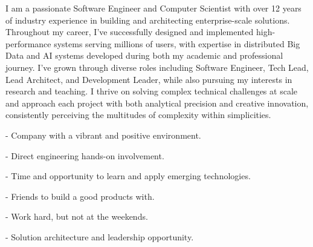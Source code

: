 \documentclass[10pt,a4paper,ragged2e,withhyper]{altacv}
\begin{document}



\begin{raggedright}
  I am a passionate Software Engineer and Computer Scientist with over 12 years of industry experience 
  in building and architecting enterprise-scale solutions. Throughout my career, I've successfully 
  designed and implemented high-performance systems serving millions of users, with expertise in 
  distributed Big Data and AI systems developed during both my academic and professional journey. 
  \newline I've grown through diverse roles including Software Engineer, Tech Lead, Lead Architect, 
  and Development Leader, while also pursuing my interests in research and teaching. I thrive on 
  solving complex technical challenges at scale and approach each project with both analytical 
  precision and creative innovation, consistently perceiving the multitudes of complexity within 
  simplicities.
\end{raggedright}

\vspace{0.4cm}


\begin{raggedright}

- Company with a vibrant and positive environment.

- Direct engineering hands-on involvement.

- Time and opportunity to learn and apply emerging technologies.

- Friends to build a good products with.

- Work hard, but not at the weekends.

- Solution architecture and leadership opportunity.

\end{raggedright}


\end{document}
